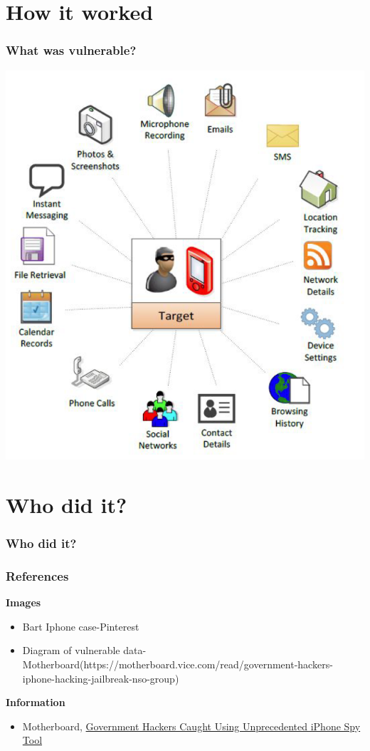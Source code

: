 \documentclass[12pt]{beamer}
\begin{document}
\section{How it worked}
\begin{frame}
	\frametitle{What was vulnerable?}
	\begin{center}
		\includegraphics[height=.85\textheight]{vulnerable_data.png}
	\end{center}
\end{frame}

\section{Who did it?}
\begin{frame}
	\frametitle{Who did it?}
\end{frame}

\begin{frame}
	\frametitle{References}
	\textbf{Images}
	\begin{itemize}
		\item Bart Iphone case-Pinterest
		\item Diagram of vulnerable data-Motherboard(https://motherboard.vice.com/read/government-hackers-iphone-hacking-jailbreak-nso-group)
	\end{itemize}
	\textbf{Information}
	\begin{itemize}
		\item Motherboard, \href{https://motherboard.vice.com/read/government-hackers-iphone-hacking-jailbreak-nso-group}{Government Hackers Caught Using Unprecedented iPhone Spy Tool}
	\end{itemize}
\end{frame}
\end{document}
